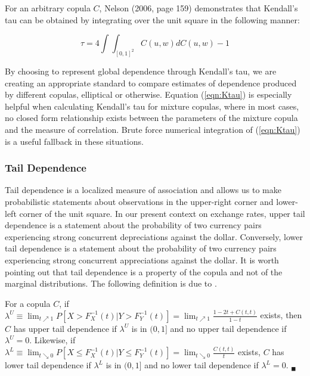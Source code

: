 For an arbitrary copula $C$, Nelson (2006, page 159) demonstrates that Kendall's tau can be obtained by integrating over the unit square in the following manner:

\begin{equation} \label{eqn:Ktau}
	\tau = 4\int\int_{\left[0,1\right]^{2}}C\left(u,w\right)dC\left(u,w\right) - 1 
\end{equation}

By choosing to represent global dependence through Kendall's tau, we are creating an appropriate standard to compare estimates of dependence produced by different copulas, elliptical or otherwise. Equation (\ref{eqn:Ktau}) is especially helpful when calculating Kendall's tau for mixture copulas, where in most cases, no closed form relationship exists between the parameters of the mixture copula and the measure of correlation. Brute force numerical integration of (\ref{eqn:Ktau}) is a useful fallback in these situations.

\subsubsection{Tail Dependence}

Tail dependence is a localized measure of association and allows us to make probabilistic statements about observations in the upper-right corner and lower-left corner of the unit square. In our present context on exchange rates, upper tail dependence is a statement about the probability of two currency pairs experiencing strong concurrent depreciations against the dollar. Conversely, lower tail dependence is a statement about the probability of two currency pairs experiencing strong concurrent appreciations against the dollar. It is worth pointing out that tail dependence is a property of the copula and not of the marginal distributions. The following definition is due to \cite{Joe_1997}.

\begin{definition} \label{defn:tail_dep}
	For a copula $C$, if $\lambda^{U}\equiv\lim_{t\nearrow 1}P\left[X > F_{X}^{-1}\left(t\right) | Y > F_{Y}^{-1}\left(t\right)\right] = \lim_{t\nearrow 1}\frac{1-2t+C\left(t,t\right)}{1-t}$ exists, then $C$ has upper tail dependence if $\lambda^{U}$ is in $(0,1]$ and no upper tail dependence if $\lambda^{U}=0$. Likewise, if $\lambda ^{L}\equiv \lim_{t\searrow 0}P\left[X\leq F_{X}^{-1}\left(t\right) | Y\leq F_{Y}^{-1}\left(t\right)\right] =\lim_{t\searrow 0}\frac{C\left(t,t\right)}{t}$ exists, $C$ has lower tail dependence if $\lambda ^{L}$ is in $(0,1]$ and no lower tail dependence if $\lambda^{L} = 0$. $_{\blacksquare}$
\end{definition}

